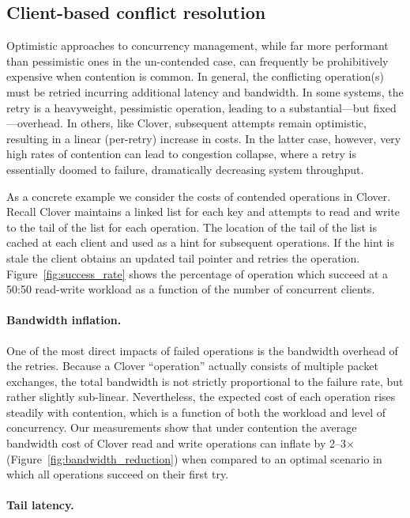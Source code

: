 \subsection{Client-based conflict resolution}

Optimistic approaches to concurrency management, while far more
performant than pessimistic ones in the un-contended case, can
frequently be prohibitively expensive when contention is common.  In
general, the conflicting operation(s) must be retried incurring
additional latency and bandwidth.  In some systems, the retry is a
heavyweight, pessimistic operation, leading to a substantial---but
fixed---overhead.  In others, like Clover, subsequent attempts remain
optimistic, resulting in a linear (per-retry) increase in costs.
In the latter case, however, very high rates of contention can lead to
congestion collapse, where a retry is essentially doomed to failure,
dramatically decreasing system throughput.

As a concrete example we consider the costs of contended operations in
Clover.  Recall Clover maintains a linked list for each key and
attempts to read and write to the tail of the list for each
operation. The location of the tail of the list is cached at each
client and used as a hint for subsequent operations.  If the hint is
stale the client obtains an updated tail pointer and retries the
operation.  Figure~\ref{fig:success_rate} shows the percentage of
operation which succeed at a 50:50 read-write workload as a
function of the number of concurrent clients.

\paragraph{Bandwidth inflation.} 

One of the most direct impacts of failed operations is the bandwidth
overhead of the retries.  Because a Clover ``operation'' actually
consists of multiple packet exchanges, the total bandwidth is not
strictly proportional to the failure rate, but rather slightly
sub-linear.  Nevertheless, the expected cost of each operation rises
steadily with contention, which is a function of both the workload and
level of concurrency.  Our measurements show that under contention the
average bandwidth cost of Clover read and write operations can inflate
by 2--3$\times$ (Figure~\ref{fig:bandwidth_reduction}) when compared
to an optimal scenario in which all operations succeed on their first
try.

\paragraph{Tail latency.}

